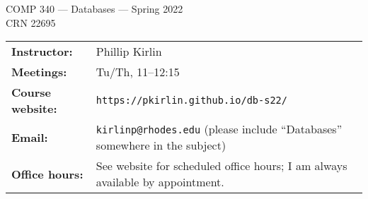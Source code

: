 \documentclass [letterpaper,11pt]{article}
\begin{document}
\begin{center}
\Large COMP 340 --- Databases --- Spring 2022
\\ \normalsize CRN 22695
\end{center}

\noindent\begin{tabular}{@{}ll}
\textbf{Instructor:} & Phillip Kirlin \\
\textbf{Meetings:} & Tu/Th, 11--12:15 \\
\textbf{Course website:} &\texttt{https://pkirlin.github.io/db-s22/} \\
\textbf{Email:} &\texttt{kirlinp@rhodes.edu} (please include ``Databases'' somewhere in the subject)\\
\textbf{Office hours:} & See website for scheduled office hours; I am always available by appointment.
\end{tabular}
\end{document}
